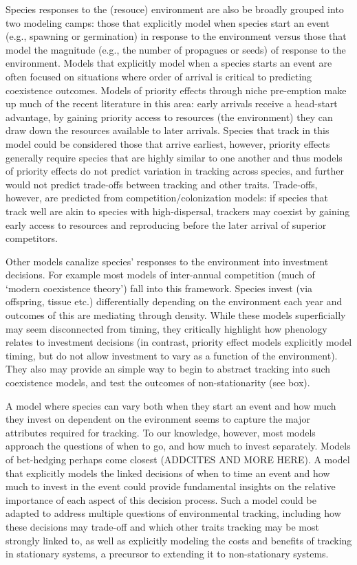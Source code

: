 \documentclass[11pt,letterpaper]{article}
\begin{document}
Species responses to the (resouce) environment are also be broadly grouped into two modeling camps: those that explicitly model when species start an event (e.g., spawning or germination) in response to the environment versus those that model the magnitude (e.g., the number of propagues or seeds) of response to the environment. Models that explicitly model when a species starts an event are often focused on situations where order of arrival is critical to predicting coexistence outcomes. Models of priority effects through niche pre-emption make up much of the recent literature in this area: early arrivals receive a head-start advantage, by gaining priority access to resources (the environment) they can draw down the resources available to later arrivals. Species that track in this model could be considered those that arrive earliest, however, priority effects generally require species that are highly similar to one another and thus models of priority effects do not predict variation in tracking across species, and further would not predict trade-offs between tracking and other traits. Trade-offs, however, are predicted from competition/colonization models: if species that track well are akin to species with high-dispersal, trackers may coexist by gaining early access to resources and reproducing before the later arrival of superior competitors. 

Other models canalize species' responses to the environment into investment decisions. For example most models of inter-annual competition (much of `modern coexistence theory') fall into this framework. Species invest (via offspring, tissue etc.) differentially depending on the environment each year and outcomes of this are mediating through density. While these models superficially may seem disconnected from timing, they critically highlight how phenology relates to investment decisions (in contrast, priority effect models explicitly model timing, but do not allow investment to vary as a function of the environment). They also may provide an simple way to begin to abstract tracking into such coexistence models, and test the outcomes of non-stationarity (see box). 

A model where species can vary both when they start an event and how much they invest on dependent on the evironment seems to capture the major attributes required for tracking. To our knowledge, however, most models approach the questions of when to go, and how much to invest separately. Models of bet-hedging perhaps come closest (ADDCITES AND MORE HERE). A model that explicitly models the linked decisions of when to time an event and how much to invest in the event could provide fundamental insights on the relative importance of each aspect of this decision process. Such a model could be adapted to address multiple questions of environmental tracking, including how these decisions may trade-off and which other traits tracking may be most strongly linked to, as well as explicitly modeling the costs and benefits of tracking in stationary systems, a precursor to extending it to non-stationary systems. 
\end{document}
